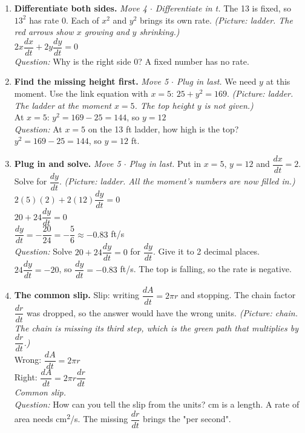 \documentclass[11pt]{article}
\begin{document}
\begin{enumerate}
\item \textbf{Differentiate both sides.} \textit{Move 4 $\cdot$ Differentiate in t.} The 13 is fixed, so $13^2$ has rate 0. Each of $x^2$ and $y^2$ brings its own rate. \textit{(Picture: ladder. The red arrows show $x$ growing and $y$ shrinking.)}\\ $2x\dfrac{dx}{dt}+2y\dfrac{dy}{dt}=0$\\ \textit{Question:} Why is the right side $0$?  A fixed number has no rate.
\item \textbf{Find the missing height first.} \textit{Move 5 $\cdot$ Plug in last.} We need $y$ at this moment. Use the link equation with $x=5$: $25+y^2=169$. \textit{(Picture: ladder. The ladder at the moment $x=5$. The top height $y$ is not given.)}\\ At $x=5$: $y^2=169-25=144$, so $y=12$\\ \textit{Question:} At $x=5$ on the 13 ft ladder, how high is the top?  $y^2=169-25=144$, so $y=12$ ft.
\item \textbf{Plug in and solve.} \textit{Move 5 $\cdot$ Plug in last.} Put in $x=5$, $y=12$ and $\dfrac{dx}{dt}=2$. Solve for $\dfrac{dy}{dt}$. \textit{(Picture: ladder. All the moment's numbers are now filled in.)}\\ $2(5)(2)+2(12)\dfrac{dy}{dt}=0$\\ $20+24\dfrac{dy}{dt}=0$\\ $\dfrac{dy}{dt}=-\dfrac{20}{24}=-\dfrac56\approx-0.83$ ft/s\\ \textit{Question:} Solve $20+24\dfrac{dy}{dt}=0$ for $\dfrac{dy}{dt}$. Give it to 2 decimal places.  $24\dfrac{dy}{dt}=-20$, so $\dfrac{dy}{dt}=-0.83$ ft/s. The top is falling, so the rate is negative.
\item \textbf{The common slip.} Slip: writing $\dfrac{dA}{dt}=2\pi r$ and stopping. The chain factor $\dfrac{dr}{dt}$ was dropped, so the answer would have the wrong units. \textit{(Picture: chain. The chain is missing its third step, which is the green path that multiplies by $\dfrac{dr}{dt}$.)}\\ Wrong: $\dfrac{dA}{dt}=2\pi r$\\ Right: $\dfrac{dA}{dt}=2\pi r\dfrac{dr}{dt}$\\ \textit{Common slip.}\\ \textit{Question:} How can you tell the slip from the units?  cm is a length. A rate of area needs cm\textsuperscript{2}/s. The missing $\dfrac{dr}{dt}$ brings the "per second".
\end{enumerate}
\end{document}
